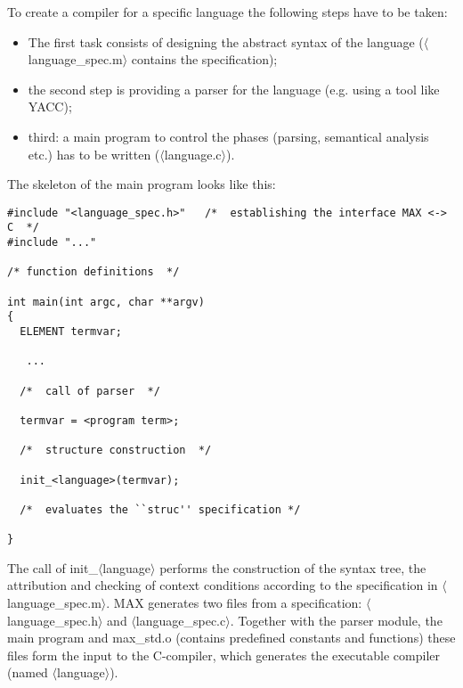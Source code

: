 \noindent
To create a compiler for a specific language the following steps have to be taken:
\begin{itemize}
\item The first task consists of designing the abstract syntax of the language ($\langle$language\_spec.m$\rangle$ contains the specification);
\item the second step is providing a parser for the language (e.g. using a tool like YACC);
\item third: a main program to control the phases (parsing, semantical analysis etc.) has to be written ($\langle$language.c$\rangle$).
\end{itemize}
\noindent
The skeleton of the main program looks like this:
\begin{verbatim}
#include "<language_spec.h>"   /*  establishing the interface MAX <-> C  */
#include "..."

/* function definitions  */

int main(int argc, char **argv)
{
  ELEMENT termvar;

   ...

  /*  call of parser  */

  termvar = <program term>;

  /*  structure construction  */

  init_<language>(termvar);

  /*  evaluates the ``struc'' specification */  

}
\end{verbatim} 
\noindent
The call of init\_$\langle$language$\rangle$ performs the construction of the syntax tree, the attribution and checking of context conditions according to the specification in $\langle$language\_spec.m$\rangle$. 
\noindent
MAX generates two files from a specification: $\langle$language\_spec.h$\rangle$ and $\langle$language\_spec.c$\rangle$. Together with the parser module, the main program and max\_std.o (contains predefined constants and functions) these files form the input to the C-compiler, which generates the executable compiler (named $\langle$language$\rangle$).\\

  
